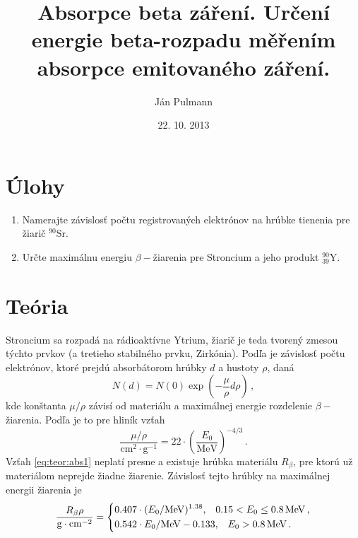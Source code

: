 \documentclass[a4paper, 10pt]{article}
\newcommand{\unit}[1]{\ensuremath{\, \mathrm{#1}}}
\begin{document}
\title{Absorpce beta záření. Určení energie beta-rozpadu měřením absorpce emitovaného záření.}
\author{Ján Pulmann}
\date{22. 10. 2013}
\maketitle
\section*{Úlohy}
\begin{enumerate}

	\item Namerajte závislosť počtu registrovaných elektrónov na hrúbke tienenia pre žiarič $^{90}\mathrm{Sr}$.
	\item Určte maximálnu energiu $\beta-$žiarenia pre Stroncium a jeho produkt $_{39}^{90}\mathrm{Y}$.

 \end{enumerate}
 
\section*{Teória}
Stroncium sa rozpadá na rádioaktívne Ytrium, žiarič je teda tvorený zmesou týchto prvkov (a tretieho stabilného prvku, Zirkónia). Podľa \cite{stud} je závislosť počtu elektrónov, ktoré prejdú absorbátorom hrúbky $d$ a hustoty $\rho$, daná
\begin{equation}
\label{eq:teor:abs1}
N(d) = N(0) \exp\left(-\frac{\mu}{\rho} d\rho\right)\,,
\end{equation}
kde konštanta $\mu/\rho$ závisí od materiálu a maximálnej energie rozdelenie $\beta-$žiarenia. Podľa \cite{stud} je to pre hliník vzťah
\begin{equation}
\label{eq:teor:mu}
\frac{\mu/\rho}{\mathrm{cm^2 \cdot g^{-1}}} = 22\cdot\left(\frac{E_0}{\mathrm{MeV}}\right)^{-4/3}\,.
\end{equation}
Vzťah \ref{eq:teor:abs1} neplatí presne a existuje hrúbka materiálu $R_\beta$, pre ktorú už materiálom neprejde žiadne žiarenie. Závislosť tejto hrúbky na maximálnej energii žiarenia je 
\begin{equation}
\label{eq:teor:Rbeta}
\frac{R_\beta \rho}{\mathrm{g\cdot cm^{-2}}} =  \begin{dcases}
     0.407 \cdot (E_0 / \mathrm{MeV})^{1.38},\;\;\; 0.15 < E_0 \le 0.8  \unit{MeV}\,,\\
     0.542 \cdot E_0 / \mathrm{MeV}-0.133,\;\;\; E_0 > 0.8  \unit{MeV}\,.
   \end{dcases}
\end{equation}
\end{document}
